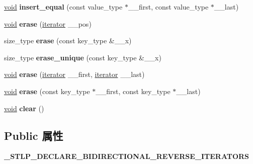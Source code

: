 \begin{DoxyCompactItemize}
\hyperlink{interfacevoid}{void} {\bfseries insert\+\_\+equal} (const value\+\_\+type $\ast$\+\_\+\+\_\+first, const value\+\_\+type $\ast$\+\_\+\+\_\+last)
\item 
\mbox{\label{class___rb__tree_af89f7874d20abb8202f08ab325016d57}} 
\hyperlink{interfacevoid}{void} {\bfseries erase} (\hyperlink{struct___rb__tree__iterator}{iterator} \+\_\+\+\_\+pos)
\item 
\mbox{\label{class___rb__tree_ab8df439a948f8f5639c085762bdf2455}} 
size\+\_\+type {\bfseries erase} (const key\+\_\+type \&\+\_\+\+\_\+x)
\item 
\mbox{\label{class___rb__tree_aafe958b5bcca96f3998bffe2857e71a0}} 
size\+\_\+type {\bfseries erase\+\_\+unique} (const key\+\_\+type \&\+\_\+\+\_\+x)
\item 
\mbox{\label{class___rb__tree_a48cc43832ff42eb33c3e86672f55ca50}} 
\hyperlink{interfacevoid}{void} {\bfseries erase} (\hyperlink{struct___rb__tree__iterator}{iterator} \+\_\+\+\_\+first, \hyperlink{struct___rb__tree__iterator}{iterator} \+\_\+\+\_\+last)
\item 
\mbox{\label{class___rb__tree_a43e8dc76a7b15275154fa8100c7a653b}} 
\hyperlink{interfacevoid}{void} {\bfseries erase} (const key\+\_\+type $\ast$\+\_\+\+\_\+first, const key\+\_\+type $\ast$\+\_\+\+\_\+last)
\item 
\mbox{\label{class___rb__tree_a20d7c9bd64c1e0b67381c0f038c28b2d}} 
\hyperlink{interfacevoid}{void} {\bfseries clear} ()
\end{DoxyCompactItemize}
\subsection*{Public 属性}
\begin{DoxyCompactItemize}
\item 
\mbox{\label{class___rb__tree_a95da28295911cb839cf6481f83f679dd}} 
{\bfseries \+\_\+\+S\+T\+L\+P\+\_\+\+D\+E\+C\+L\+A\+R\+E\+\_\+\+B\+I\+D\+I\+R\+E\+C\+T\+I\+O\+N\+A\+L\+\_\+\+R\+E\+V\+E\+R\+S\+E\+\_\+\+I\+T\+E\+R\+A\+T\+O\+RS}
\end{DoxyCompactItemize}

